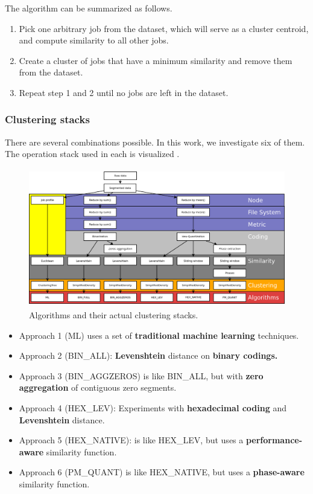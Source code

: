 \documentclass[]{llncs}
\begin{document}
The algorithm can be summarized as follows.
\begin{enumerate}
 \item Pick one arbitrary job from the dataset, which will serve as a cluster centroid, and compute similarity to all other jobs.
 \item Create a cluster of jobs that have a minimum similarity and remove them from the dataset.
 \item Repeat step 1 and 2 until no jobs are left in the dataset.
\end{enumerate}

\subsubsection{Clustering stacks}
There are several combinations possible.
In this work, we investigate six of them.
The operation stack used in each is visualized .
\begin{figure}
  \centering
  \includegraphics[width=4.61in,height=2.38in]{./media/image3.png}
  \caption{Algorithms and their actual clustering stacks.}
  \label{fig:clustering_stacks}
\end{figure}
\begin{itemize}
 \item Approach 1 (ML) uses a set of\textbf{ traditional machine learning} techniques. 
 \item Approach 2 (BIN\_ALL): \textbf{Levenshtein} distance on \textbf{binary codings.}
 \item Approach 3 (BIN\_AGGZEROS) is like BIN\_ALL, but with \textbf{zero aggregation }of contiguous zero segments.
 \item Approach 4 (HEX\_LEV): Experiments with \textbf{hexadecimal coding }and \textbf{Levenshtein }distance.
 \item Approach 5 (HEX\_NATIVE): is like HEX\_LEV, but uses a \textbf{performance-aware }similarity function.
 \item Approach 6 (PM\_QUANT) is like HEX\_NATIVE, but uses a \textbf{phase-aware }similarity function.
\end{itemize}
\end{document}
